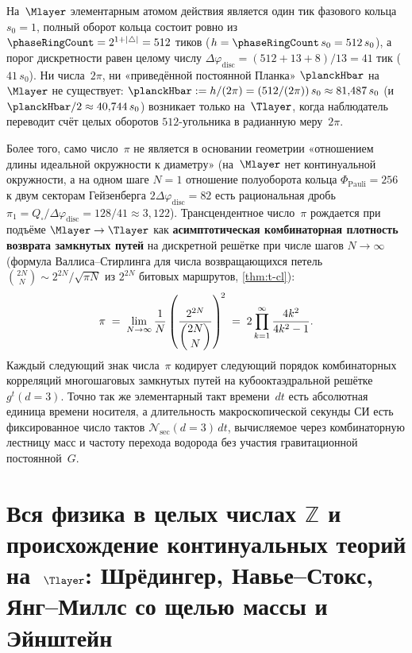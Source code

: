 \begin{remark}[Откуда берётся $2\pi$ в $\planckHbar = h/(2\pi)$ и что такое само число $\pi$ на решётке]
\label{rem:hbar-is-t-artifact}
На~$\Mlayer$ элементарным атомом действия является один тик фазового кольца $s_0 = 1$, полный оборот кольца
состоит ровно из $\phaseRingCount = 2^{1+|\triangle|} = 512$ тиков ($h = \phaseRingCount\,s_0 = 512\,s_0$),
а порог дискретности равен целому числу $\Delta\varphi_{\mathrm{disc}} = (512+13+8)/13 = 41$ тик ($41\,s_0$).
Ни числа~$2\pi$, ни «приведённой постоянной Планка» $\planckHbar$ на~$\Mlayer$ не существует:
$\planckHbar := h/(2\pi) = (512/(2\pi))\,s_0 \approx 81{,}487\,s_0$ (и $\planckHbar/2 \approx 40{,}744\,s_0$)
возникает только на~$\Tlayer$, когда наблюдатель переводит счёт целых оборотов $512$-угольника в радианную меру~$2\pi$.

Более того, само число~$\pi$ не является в основании геометрии «отношением длины идеальной окружности к диаметру»
(на~$\Mlayer$ нет континуальной окружности, а на одном шаге $N=1$ отношение полуоборота кольца $\Phi_{\mathrm{Pauli}}=256$
к двум секторам Гейзенберга $2\Delta\varphi_{\mathrm{disc}}=82$ есть рациональная дробь $\pi_1 = Q_\square/\Delta\varphi_{\mathrm{disc}} = 128/41 \approx 3{,}122$).
Трансцендентное число~$\pi$ рождается при подъёме $\Mlayer\to\Tlayer$ как \textbf{асимптотическая комбинаторная плотность
возврата замкнутых путей} на дискретной решётке при числе шагов $N\to\infty$ (формула Валлиса--Стирлинга для числа
возвращающихся петель $\binom{2N}{N} \sim 2^{2N}/\sqrt{\pi N}$ из $2^{2N}$ битовых маршрутов, \cref{thm:t-cl}):
\[
  \pi \;=\; \lim_{N\to\infty} \frac{1}{N}\left(\frac{2^{2N}}{\dbinom{2N}{N}}\right)^{\!2}
  \;=\; 2\prod_{k=1}^{\infty}\frac{4k^2}{4k^2-1}.
\]
Каждый следующий знак числа~$\pi$ кодирует следующий порядок комбинаторных корреляций многошаговых замкнутых
путей на кубооктаэдральной решётке $g^t(d=3)$.
Точно так же элементарный такт времени~$dt$ есть абсолютная единица времени носителя, а длительность макроскопической
секунды СИ есть фиксированное число тактов $\mathcal{N}_{\mathrm{sec}}(d=3)\,dt$, вычисляемое через
комбинаторную лестницу масс и частоту перехода водорода без участия гравитационной постоянной~$G$.
\end{remark}

\section{Вся физика в целых числах \texorpdfstring{$\mathbb{Z}$}{Z} и происхождение континуальных теорий на~\texorpdfstring{$\Tlayer$}{T}: Шрёдингер, Навье--Стокс, Янг--Миллс со щелью массы и Эйнштейн}
\label{sec:z-to-continuum-theories}

